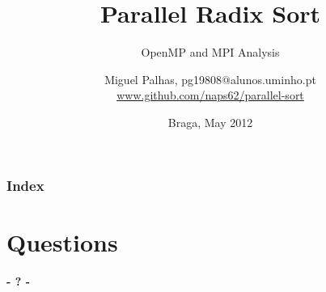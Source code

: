 \documentclass{beamer}
\title{Parallel Radix Sort}
\subtitle{OpenMP and MPI Analysis}
\author{Miguel Palhas, pg19808@alunos.uminho.pt \\
	\footnotesize{\url{www.github.com/naps62/parallel-sort}}}
\institute[19808]{
	University of Minho\\
	Department of Informatics
}
\date{Braga, May 2012}
\begin{document}

\maketitle

\begin{frame}
	\frametitle{Index}
	\tableofcontents
\end{frame}



\section{Questions}
\begin{frame}
	\titlepage
	\begin{center}
		\Huge\bfseries
		- ? -
	\end{center}
\end{frame}
\end{document}
